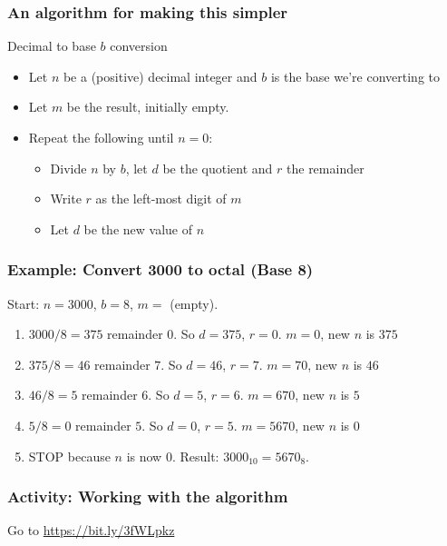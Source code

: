 \documentclass{beamer}
\begin{document}
\begin{frame}
    \frametitle{An algorithm for making this simpler}

    \begin{block}{Decimal to base $b$ conversion}
        \begin{itemize}
            \item Let $n$ be a (positive) decimal integer and $b$ is the base we're converting to
            \item Let $m$ be the result, initially empty. 
            \item Repeat the following until $n=0$: 
            \begin{itemize}
                \item Divide $n$ by $b$, let $d$ be the quotient and $r$ the remainder 
                \item Write $r$ as the left-most digit of $m$ 
                \item Let $d$ be the new value of $n$ 
            \end{itemize}
        \end{itemize}
    \end{block}

\end{frame}


\begin{frame}
    \frametitle{Example: Convert 3000 to octal (Base 8)}

Start: $n=3000$, $b=8$, $m=$ (empty). 

    \begin{enumerate}
        \item $3000/8 = 375$ remainder $0$. So $d=375$, $r=0$. $m = 0$, new $n$ is $375$ \pause
        \item $375/8 = 46$ remainder $7$. So $d=46$, $r=7$. $m = 70$, new $n$ is $46$ \pause
        \item $46/8 = 5$ remainder $6$. So $d=5$, $r=6$. $m = 670$, new $n$ is $5$ \pause
        \item $5/8 = 0$ remainder $5$. So $d=0$, $r=5$. $m = 5670$, new $n$ is $0$ \pause
        \item STOP because $n$ is now $0$. Result: $3000_{10} = 5670_8$.
    \end{enumerate}

\end{frame}

\begin{frame}
    \frametitle{Activity: Working with the algorithm}

    \begin{Large}
        \begin{center}
            Go to \url{https://bit.ly/3fWLpkz}
        \end{center}   
    \end{Large}


\end{frame}
\end{document}
